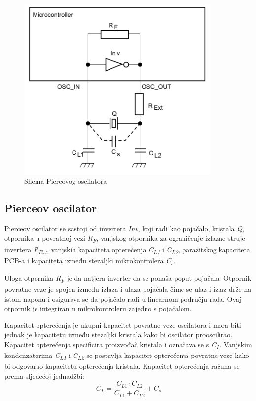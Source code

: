 \begin{figure}[hbt]
    \centering
    \includegraphics[width=10cm]{Figures/pierce.PNG}
    \caption{Shema Piercovog oscilatora \cite{stmicroelectronics:an2867}}
    \label{slk:PIERCE}
\end{figure}

\subsection{Pierceov oscilator}
Pierceov oscilator se sastoji od invertera \textit{Inv}, koji radi kao pojačalo, kristala \textit{Q}, otpornika u povratnoj vezi \textit{R\textsubscript{F}}, vanjskog otpornika za ograničenje izlazne struje invertera \textit{R\textsubscript{Ext}}, vanjskih kapaciteta opterećenja \textit{C\textsubscript{L1}} i \textit{C\textsubscript{L2}}, parazitskog kapaciteta PCB-a i kapaciteta između stezaljki mikrokontrolera \textit{C\textsubscript{s}}.

Uloga otpornika \textit{R\textsubscript{F}} je da natjera inverter da se ponaša poput pojačala. Otpornik povratne veze je spojen između izlaza i ulaza pojačala čime se ulaz i izlaz drže na istom naponu i osigurava se da pojačalo radi u linearnom području rada. Ovaj otpornik je integriran u mikrokontroleru zajedno s pojačalom.

Kapacitet opterećenja je ukupni kapacitet povratne veze oscilatora i mora biti jednak je kapacitetu između stezaljki kristala kako bi oscilator prooscilirao. Kapacitet opterećenja specificira proizvođač kristala i označava se s \textit{C\textsubscript{L}}. Vanjskim kondenzatorima \textit{C\textsubscript{L1}} i \textit{C\textsubscript{L2}} se postavlja kapacitet opterećenja povratne veze kako bi odgovarao kapacitetu opterećenja kristala. Kapacitet opterećenja računa se prema sljedećoj jednadžbi:
\begin{equation} \label{eq:CLOAD}
    C_L=\frac{C_{L1}\cdot C_{L2}}{C_{L1}+C_{L2}}+C_s
\end{equation}

